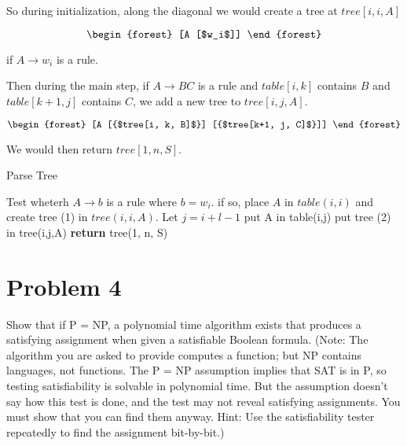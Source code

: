 \documentclass[11pt]{article}
\begin{document}
So during initialization, along the diagonal we would create a tree at $tree[i,i, A]$

\begin{equation}
\begin{forest}
[A [$w_i$]]
\end{forest}
\end{equation}


if $A \rightarrow w_i$ is a rule.

Then during the main step, if $A \rightarrow BC$ is a rule and $table[i,k]$ contains $B$ and $table[k+1, j]$ contains $C$, we add a new tree to $tree[i, j, A]$. 

\begin{equation}
\begin{forest}
[A [{$tree[i, k, B]$}]  [{$tree[k+1, j, C]$}]]
\end{forest}
\end{equation}


We would then return $tree[1, n, S]$.

\begin{algorithm}
    \caption{Parse Tree}\label{guests}
    \begin{algorithmic}[1]
				\State Test wheterh $A \rightarrow b$ is a rule where $b = w_i$.
				\State if so, place $A$ in $table(i,i)$ and create tree (1) in $tree(i, i, A)$. 
			\EndFor
		\EndFor
				\State Let $j = i + l - 1$
							\State put A in table(i,j)
							\State put tree (2) in tree(i,j,A)
						\EndIf	
					\EndFor				
				\EndFor			
			\EndFor
		\EndFor
       \State \textbf{return} tree(1, n, S)
    \EndFunction
    \end{algorithmic}
\end{algorithm}


\newpage
\section*{Problem 4}

Show that if P = NP, a polynomial time algorithm exists that produces a satisfying
assignment when given a satisfiable Boolean formula. (Note: The algorithm you
are asked to provide computes a function; but NP contains languages, not functions. The P = NP assumption implies that SAT is in P, so testing satisfiability is
solvable in polynomial time. But the assumption doesn’t say how this test is done,
and the test may not reveal satisfying assignments. You must show that you can find
them anyway. Hint: Use the satisfiability tester repeatedly to find the assignment
bit-by-bit.)
\end{document}
